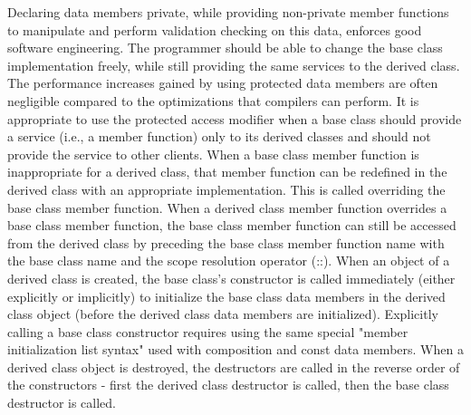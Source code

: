 \documentclass{report}
\begin{document}
    \bigbreak \noindent 
    Declaring data members private, while providing non-private member functions to manipulate and perform validation checking on this data, enforces good software engineering. The programmer should be able to change the base class implementation freely, while still providing the same services to the derived class. The performance increases gained by using protected data members are often negligible compared to the optimizations that compilers can perform. It is appropriate to use the protected access modifier when a base class should provide a service (i.e., a member function) only to its derived classes and should not provide the service to other clients.
    \bigbreak \noindent 
    When a base class member function is inappropriate for a derived class, that member function can be redefined in the derived class with an appropriate implementation. This is called overriding the base class member function.
    \bigbreak \noindent 
    When a derived class member function overrides a base class member function, the base class member function can still be accessed from the derived class by preceding the base class member function name with the base class name and the scope resolution operator (::).
    \bigbreak \noindent 
    When an object of a derived class is created, the base class's constructor is called immediately (either explicitly or implicitly) to initialize the base class data members in the derived class object (before the derived class data members are initialized). Explicitly calling a base class constructor requires using the same special "member initialization list syntax" used with composition and const data members.
    \bigbreak \noindent 
    When a derived class object is destroyed, the destructors are called in the reverse order of the constructors - first the derived class destructor is called, then the base class destructor is called.
    \bigbreak \noindent 
    \bigbreak \noindent 
\end{document}
